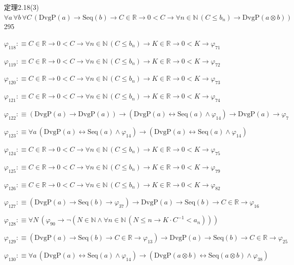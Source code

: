 \begin{fullproof}{定理2.18(3)}{$\forall a\,\forall b\,\forall C\,(\mathrm{DvgP}(a) \to \mathrm{Seq}(b) \to C \in \mathbb{R} \to 0 < C \to \forall n \in \mathbb{N}\,(C \leq b_{n}) \to \mathrm{DvgP}(a \otimes b))$}{295}
\begin{abbrevlist}
\item $\varphi_{118} :\equiv C \in \mathbb{R} \to 0 < C \to \forall n \in \mathbb{N}\,(C \leq b_{n}) \to K \in \mathbb{R} \to 0 < K \to \varphi_{71}$
\item $\varphi_{119} :\equiv C \in \mathbb{R} \to 0 < C \to \forall n \in \mathbb{N}\,(C \leq b_{n}) \to K \in \mathbb{R} \to 0 < K \to \varphi_{72}$
\item $\varphi_{120} :\equiv C \in \mathbb{R} \to 0 < C \to \forall n \in \mathbb{N}\,(C \leq b_{n}) \to K \in \mathbb{R} \to 0 < K \to \varphi_{73}$
\item $\varphi_{121} :\equiv C \in \mathbb{R} \to 0 < C \to \forall n \in \mathbb{N}\,(C \leq b_{n}) \to K \in \mathbb{R} \to 0 < K \to \varphi_{74}$
\item $\varphi_{122} :\equiv (\mathrm{DvgP}(a) \to \mathrm{DvgP}(a)) \to (\mathrm{DvgP}(a) \leftrightarrow \mathrm{Seq}(a) \land \varphi_{14}) \to \mathrm{DvgP}(a) \to \varphi_{7}$
\item $\varphi_{123} :\equiv \forall a\,(\mathrm{DvgP}(a) \leftrightarrow \mathrm{Seq}(a) \land \varphi_{14}) \to (\mathrm{DvgP}(a) \leftrightarrow \mathrm{Seq}(a) \land \varphi_{14})$
\item $\varphi_{124} :\equiv C \in \mathbb{R} \to 0 < C \to \forall n \in \mathbb{N}\,(C \leq b_{n}) \to K \in \mathbb{R} \to 0 < K \to \varphi_{75}$
\item $\varphi_{125} :\equiv C \in \mathbb{R} \to 0 < C \to \forall n \in \mathbb{N}\,(C \leq b_{n}) \to K \in \mathbb{R} \to 0 < K \to \varphi_{79}$
\item $\varphi_{126} :\equiv C \in \mathbb{R} \to 0 < C \to \forall n \in \mathbb{N}\,(C \leq b_{n}) \to K \in \mathbb{R} \to 0 < K \to \varphi_{82}$
\item $\varphi_{127} :\equiv (\mathrm{DvgP}(a) \to \mathrm{Seq}(b) \to \varphi_{37}) \to \mathrm{DvgP}(a) \to \mathrm{Seq}(b) \to C \in \mathbb{R} \to \varphi_{16}$
\item $\varphi_{128} :\equiv \forall N\,(\varphi_{90} \to \neg (N \in \mathbb{N} \land \forall n \in \mathbb{N}\,(N \leq n \to K \cdot C^{-1} < a_{n})))$
\item $\varphi_{129} :\equiv (\mathrm{DvgP}(a) \to \mathrm{Seq}(b) \to C \in \mathbb{R} \to \varphi_{13}) \to \mathrm{DvgP}(a) \to \mathrm{Seq}(b) \to C \in \mathbb{R} \to \varphi_{25}$
\item $\varphi_{130} :\equiv \forall a\,(\mathrm{DvgP}(a) \leftrightarrow \mathrm{Seq}(a) \land \varphi_{14}) \to (\mathrm{DvgP}(a \otimes b) \leftrightarrow \mathrm{Seq}(a \otimes b) \land \varphi_{38})$

\end{abbrevlist}
\end{fullproof}

